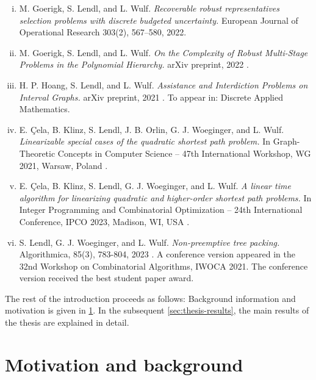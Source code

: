 \begin{enumerate}[(i)]
\item M. Goerigk, S. Lendl, and L. Wulf. \textit{Recoverable robust representatives selection problems with discrete budgeted uncertainty.} European Journal of Operational Research 303(2), 567--580, 2022. \cite{goerigk2022recoverable}

\item M. Goerigk, S. Lendl, and L. Wulf. \textit{On the Complexity of Robust Multi-Stage Problems in the Polynomial Hierarchy.} arXiv preprint, 2022 \cite{goerigk2022complexity}.

\item H. P. Hoang, S. Lendl, and L. Wulf.  \textit{Assistance and Interdiction Problems on Interval Graphs.} arXiv preprint, 2021 \cite{hoang2021assistance}. To appear in: Discrete Applied Mathematics.

\item E. Çela, B. Klinz, S. Lendl, J. B. Orlin, G. J. Woeginger, and L. Wulf. \textit{Linearizable
special cases of the quadratic shortest path problem.} In Graph-Theoretic Concepts in Computer Science -- 47th
International Workshop, WG 2021, Warsaw, Poland \cite{cela2021linearizable}.

\item E. Çela, B. Klinz, S. Lendl, G. J. Woeginger, and L. Wulf. \textit{A linear time algorithm
for linearizing quadratic and higher-order shortest path problems.} In Integer Programming and Combinatorial Optimization -- 24th
International Conference, IPCO 2023, Madison, WI, USA \cite{cela2023linear}.

\item S. Lendl, G. J. Woeginger, and L. Wulf. \textit{Non-preemptive tree packing.} Algorithmica, 85(3), 783-804, 2023 \cite{lendl2023nonpreemptive}. A conference version appeared in the 32nd Workshop on Combinatorial Algorithms, IWOCA 2021. The conference version received the best student paper award.
 \end{enumerate}

The rest of the introduction proceeds as follows: Background information and motivation is given in \cref{sec:motivation-background}. In the subsequent  \cref{sec:thesis-results}, the main results of the thesis are explained in detail.

\section{Motivation and background}
\label{sec:motivation-background}

